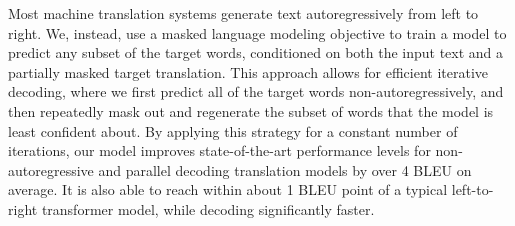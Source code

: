 Most machine translation systems generate text autoregressively from left to right.
We, instead, use a masked language modeling objective to train a model to predict any subset of the target words, conditioned on both the input text and a partially masked target translation.
This approach allows for efficient iterative decoding, where we first predict all of the target words non-autoregressively, and then repeatedly mask out and regenerate the subset of words that the model is least confident about.
By applying this strategy for a constant number of iterations, our model improves state-of-the-art performance levels for non-autoregressive and parallel decoding translation models by over 4 BLEU on average.
It is also able to reach within about 1 BLEU point of a typical left-to-right transformer model, while decoding significantly faster.